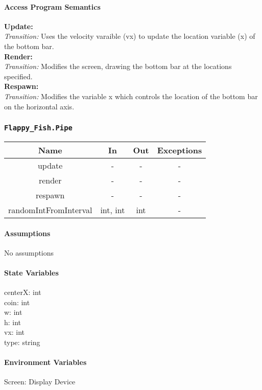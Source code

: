 \documentclass[11pt, oneside]{article}   	%
\begin{document}
\paragraph{Access Program Semantics} 
 \textbf{Update:}  \\
 \textit{Transition:} Uses the velocity varaible (vx) to update the location variable (x) of the bottom bar.\\
 \textbf{Render:}  \\
 \textit{Transition:} Modifies the screen, drawing the bottom bar at the locations specified.\\
 \textbf{Respawn:}  \\
 \textit{Transition:} Modifies the variable x which controls the location of the bottom bar on the horizontal axis.\\


\subsubsection{\texttt{Flappy\_Fish.Pipe}}



\begin{center}
\begin{tabular}{ |c|c|c|c| } 
 \hline
 Name & In & Out & Exceptions \\ 
 \hline \hline
 update &-  & - & - \\ 
render & - & - & - \\ 
respawn & - & - & - \\ 
randomIntFromInterval & int, int & int & - \\
 \hline
\end{tabular}
\end{center}

\paragraph{Assumptions}
No assumptions

\paragraph{State Variables}
centerX: int\\
coin: int\\
w: int\\
h: int \\
vx: int \\
type: string\\
\paragraph{Environment Variables}
Screen: Display Device
\end{document}
